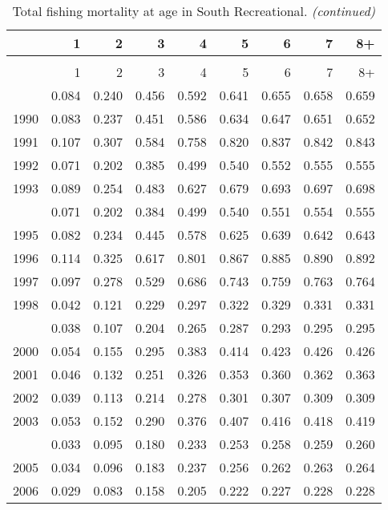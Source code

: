 \documentclass[
]{article}
\begin{document}
\begin{longtable}[t]{lrrrrrrrr}
\caption{\label{tab:South_Recreational-fleet-FAA-table}Total fishing mortality at age in South Recreational.}\\
\toprule
  & 1 & 2 & 3 & 4 & 5 & 6 & 7 & 8+\\
\midrule
\endfirsthead
\caption[]{Total fishing mortality at age in South Recreational. \textit{(continued)}}\\
\toprule
  & 1 & 2 & 3 & 4 & 5 & 6 & 7 & 8+\\
\midrule
\endhead

\endfoot
\bottomrule
\endlastfoot
1989 & 0.084 & 0.240 & 0.456 & 0.592 & 0.641 & 0.655 & 0.658 & 0.659\\
1990 & 0.083 & 0.237 & 0.451 & 0.586 & 0.634 & 0.647 & 0.651 & 0.652\\
1991 & 0.107 & 0.307 & 0.584 & 0.758 & 0.820 & 0.837 & 0.842 & 0.843\\
1992 & 0.071 & 0.202 & 0.385 & 0.499 & 0.540 & 0.552 & 0.555 & 0.555\\
1993 & 0.089 & 0.254 & 0.483 & 0.627 & 0.679 & 0.693 & 0.697 & 0.698\\
\addlinespace
1994 & 0.071 & 0.202 & 0.384 & 0.499 & 0.540 & 0.551 & 0.554 & 0.555\\
1995 & 0.082 & 0.234 & 0.445 & 0.578 & 0.625 & 0.639 & 0.642 & 0.643\\
1996 & 0.114 & 0.325 & 0.617 & 0.801 & 0.867 & 0.885 & 0.890 & 0.892\\
1997 & 0.097 & 0.278 & 0.529 & 0.686 & 0.743 & 0.759 & 0.763 & 0.764\\
1998 & 0.042 & 0.121 & 0.229 & 0.297 & 0.322 & 0.329 & 0.331 & 0.331\\
\addlinespace
1999 & 0.038 & 0.107 & 0.204 & 0.265 & 0.287 & 0.293 & 0.295 & 0.295\\
2000 & 0.054 & 0.155 & 0.295 & 0.383 & 0.414 & 0.423 & 0.426 & 0.426\\
2001 & 0.046 & 0.132 & 0.251 & 0.326 & 0.353 & 0.360 & 0.362 & 0.363\\
2002 & 0.039 & 0.113 & 0.214 & 0.278 & 0.301 & 0.307 & 0.309 & 0.309\\
2003 & 0.053 & 0.152 & 0.290 & 0.376 & 0.407 & 0.416 & 0.418 & 0.419\\
\addlinespace
2004 & 0.033 & 0.095 & 0.180 & 0.233 & 0.253 & 0.258 & 0.259 & 0.260\\
2005 & 0.034 & 0.096 & 0.183 & 0.237 & 0.256 & 0.262 & 0.263 & 0.264\\
2006 & 0.029 & 0.083 & 0.158 & 0.205 & 0.222 & 0.227 & 0.228 & 0.228\\

\end{longtable}
\end{document}
